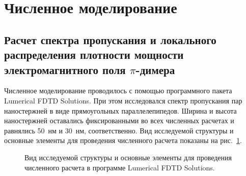 \section{Численное моделирование}
\subsection{Расчет спектра пропускания и локального распределения плотности мощности электромагнитного поля $ \pi $-димера}

Численное моделирование проводилось с помощью программного пакета Lumerical FDTD Solutions. При этом исследовался спектр пропускания пар наностержней в виде прямоугольных параллелепипедов. Ширина и высота наностержней оставались фиксированными во всех численных расчетах и равнялись 50~нм и 30~нм, соответственно. Вид исследуемой структуры и основные элементы для проведения численного расчета показаны на рис.~\ref{img:lumerical}.
\begin{figure}[h]
\caption{Вид исследуемой структуры и основные элементы для проведения численного расчета в программе Lumerical FDTD Solutions.}
\label{img:lumerical}
\end{figure}

